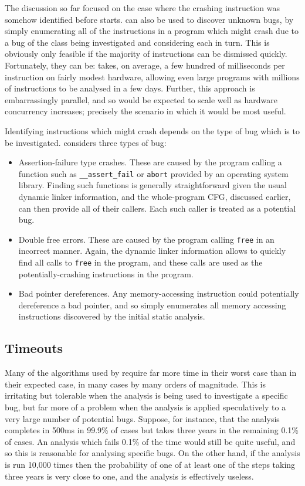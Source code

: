 The discussion so far focused on the case where the crashing
instruction was somehow identified before {\technique} starts.
{\Technique} can also be used to discover unknown bugs, by simply
enumerating all of the instructions in a program which might crash due
to a bug of the class being investigated and considering each in turn.
This is obviously only feasible if the majority of instructions can be
dismissed quickly.  Fortunately, they can be: {\implementation} takes,
on average, a few hundred of milliseconds per instruction on fairly
modest hardware, allowing even large programs with millions of
instructions to be analysed in a few days.  Further, this approach is
embarrassingly parallel, and so would be expected to scale well as
hardware concurrency increases; precisely the scenario in which it
would be most useful.

Identifying instructions which might crash depends on the type of bug
which is to be investigated.  {\Implementation} considers three types
of bug:

\begin{itemize}
\item Assertion-failure type crashes.  These are caused by the program
  calling a function such as \verb|__assert_fail| or \verb|abort|
  provided by an operating system library.  Finding such functions is
  generally straightforward given the usual dynamic linker
  information, and the whole-program CFG, discussed earlier, can then
  provide all of their callers.  Each such caller is treated as a
  potential bug.
\item Double free errors.  These are caused by the program calling
  \verb|free| in an incorrect manner.  Again, the dynamic linker
  information allows {\implementation} to quickly find all calls to
  \verb|free| in the program, and these calls are used as the
  potentially-crashing instructions in the program.
\item Bad pointer dereferences.  Any memory-accessing instruction
  could potentially dereference a bad pointer, and so
  {\implementation} simply enumerates all memory accessing
  instructions discovered by the initial static analysis.
\end{itemize}

\subsection{Timeouts}

Many of the algorithms used by {\technique} require far more time in
their worst case than in their expected case, in many cases by many
orders of magnitude.  This is irritating but tolerable when the
analysis is being used to investigate a specific bug, but far more of
a problem when the analysis is applied speculatively to a very large
number of potential bugs.  Suppose, for instance, that the analysis
completes in 500ms in 99.9\% of cases but takes three years in the
remaining 0.1\% of cases.  An analysis which fails 0.1\% of the time
would still be quite useful, and so this is reasonable for analysing
specific bugs.  On the other hand, if the analysis is run 10,000 times
then the probability of one of at least one of the steps taking three
years is very close to one, and the analysis is effectively useless.

